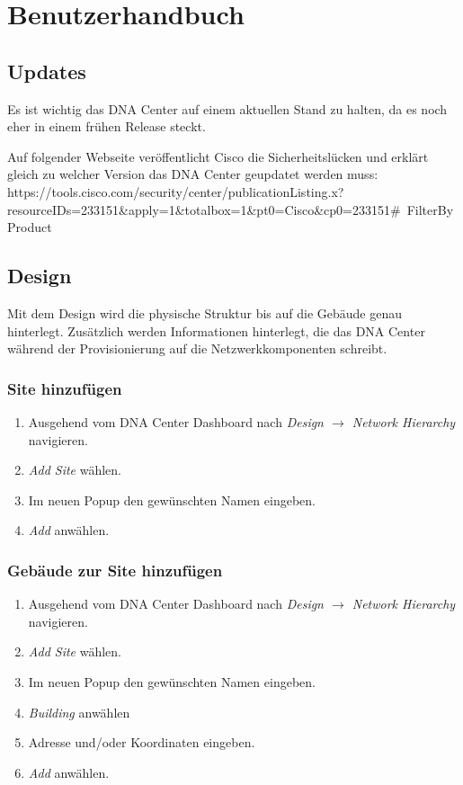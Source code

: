 \section{Benutzerhandbuch}

\subsection{Updates}
Es ist wichtig das DNA Center auf einem aktuellen Stand zu halten, da es noch eher in einem frühen Release steckt.

Auf folgender Webseite veröffentlicht Cisco die Sicherheitslücken und erklärt gleich zu welcher Version das DNA Center geupdatet werden muss:
https://tools.cisco.com/security/center/publicationListing.x?resourceIDs=233151\&apply=1\&totalbox=1\&pt0=Cisco\&cp0=233151\#~FilterByProduct

\subsection{Design}
Mit dem Design wird die physische Struktur bis auf die Gebäude genau hinterlegt. Zusätzlich werden Informationen hinterlegt, die das DNA Center während der Provisionierung auf die Netzwerkkomponenten schreibt. 

\subsubsection{Site hinzufügen}
\begin{enumerate}
	\item Ausgehend vom DNA Center Dashboard nach \textit{Design $\rightarrow$ Network Hierarchy} navigieren. 
	\item \textit{Add Site} wählen. 
	\item Im neuen Popup den gewünschten Namen eingeben.
	\item \textit{Add} anwählen. 	
\end{enumerate}

\subsubsection{Gebäude zur Site hinzufügen}
\begin{enumerate}
	\item Ausgehend vom DNA Center Dashboard nach \textit{Design $\rightarrow$ Network Hierarchy} navigieren. 
	\item \textit{Add Site} wählen. 
	\item Im neuen Popup den gewünschten Namen eingeben.
	\item \textit{Building} anwählen
	\item Adresse und/oder Koordinaten eingeben.
	\item \textit{Add} anwählen.
\end{enumerate}


